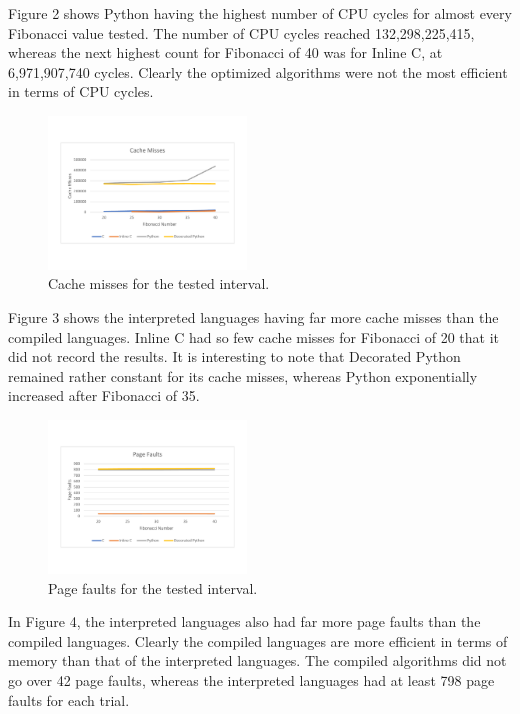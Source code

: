 \documentclass{sig-alternate}
\begin{document}
Figure 2 shows Python having the highest 
number of CPU cycles for almost every Fibonacci value tested. The 
number of CPU cycles reached 132,298,225,415,
 whereas the next highest count for Fibonacci of 40 
was for Inline C, at 6,971,907,740 cycles. Clearly the optimized
 algorithms were not the most efficient in terms of CPU cycles.

\begin{figure}[ht]
	\centering
		\includegraphics[width=0.47\textwidth] {CacheMisses.pdf}
	\caption{Cache misses for the tested interval.}
	\label{Cache misses}
\end{figure}

Figure 3 shows the interpreted languages having far more cache misses than the compiled languages. Inline C had so few cache misses for Fibonacci of 20 that it did not record the results. It is interesting to note that Decorated Python remained rather constant for its cache misses, whereas Python exponentially increased after Fibonacci of 35.

\begin{figure}[h]
	\centering
		\includegraphics[width=0.47\textwidth] {PageFaults.pdf}
	\caption{Page faults for the tested interval.}
	\label{Page Faults}
\end{figure}

In Figure 4, the interpreted languages also had far more page faults than the compiled languages. Clearly the 
compiled languages are more efficient in terms of memory than that of the interpreted languages. The compiled algorithms did not go over 42 page faults, whereas the interpreted languages had at least 798 page faults for each trial.
\end{document}
